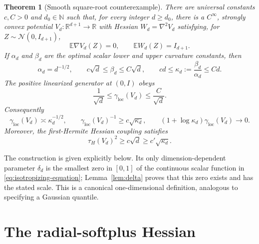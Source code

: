 \documentclass[11pt]{article}
\numberwithin{equation}{section}
\newtheorem{theorem}{Theorem}[section]
\newcommand{\R}{\mathbb R}
\newcommand{\E}{\mathbb E}
\newcommand{\loc}{\mathrm{loc}}
\begin{document}
\begin{theorem}[Smooth square-root counterexample]\label{thm:main}
There are universal constants $c,C>0$ and $d_0\in\mathbb N$ such that, for
every integer $d\ge d_0$, there is a $C^\infty$, strongly convex potential
$V_d:\R^{d+1}\to\R$ with Hessian $W_d=\nabla^2V_d$ satisfying, for
$Z\sim\mathcal N(0,I_{d+1})$,
\begin{equation}\label{eq:equilibrium}
  \E\nabla V_d(Z)=0,
  \qquad
  \E W_d(Z)=I_{d+1}.
\end{equation}
If $\alpha_d$ and $\beta_d$ are the optimal scalar lower and upper curvature
constants, then
\begin{equation}\label{eq:kappa-scale}
  \alpha_d=d^{-1/2},
  \qquad
  c\sqrt d\le\beta_d\le C\sqrt d,
  \qquad
  c d\le\kappa_d:=\frac{\beta_d}{\alpha_d}\le C d.
\end{equation}
The positive linearized generator at $(0,I)$ obeys
\begin{equation}\label{eq:gap-scale}
  \frac1{\sqrt d}
  \le\gamma_{\loc}(V_d)
  \le\frac C{\sqrt d}.
\end{equation}
Consequently
\begin{equation}\label{eq:counter-conclusion}
  \gamma_{\loc}(V_d)\asymp\kappa_d^{-1/2},
  \qquad
  \gamma_{\loc}(V_d)^{-1}\ge c\sqrt{\kappa_d},
  \qquad
  (1+\log\kappa_d)\gamma_{\loc}(V_d)\longrightarrow0.
\end{equation}
Moreover, the first-Hermite Hessian coupling satisfies
\begin{equation}\label{eq:tau-lower-main}
  \tau_H(V_d)^2\ge c\sqrt d\ge c'\sqrt{\kappa_d}.
\end{equation}
\end{theorem}

The construction is given explicitly below.  Its only dimension-dependent
parameter $\delta_d$ is the smallest zero in $[0,1]$ of the continuous scalar
function in \eqref{eq:isotropizing-equation}; Lemma~\ref{lem:delta} proves
that this zero exists and has the stated scale.  This is a canonical
one-dimensional definition, analogous to specifying a Gaussian quantile.

\section{The radial-softplus Hessian}
\end{document}

